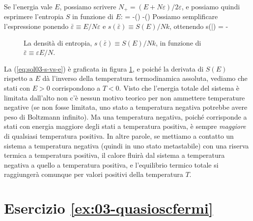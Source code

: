Se l'energia vale $E$, possiamo scrivere $N_{+} = (E+N\varepsilon)/2\varepsilon$, e possiamo quindi esprimere l'entropia $S$ in funzione di $E$:
\be
\label{eq:SE}
 = -\ln\left(\right)
-\ln\left(\right)
\ee
Possiamo semplificare l'espressione ponendo $\bar\varepsilon \equiv E/N\varepsilon$ e $s(\bar\varepsilon) \equiv S(E)/Nk$, ottenendo
\be
\label{eq:sol03-s-vs-e}
s(\bar\varepsilon) =  - 
\ee
\begin{figure}[h]
  \centering
  
  \caption{La densità di entropia, $s(\bar\varepsilon) \equiv S(E)/Nk$, in funzione di $\bar\varepsilon \equiv \varepsilon E/N$.} 
  \label{fig:03-sol-s-vs-e}
\end{figure}
\noindent
La (\ref{eq:sol03-s-vs-e}) è graficata in figura \ref{fig:03-sol-s-vs-e}, e poiché la derivata di $S(E)$ rispetto a $E$ dà l'inverso della temperatura termodinamica assoluta, vediamo che stati con $E > 0$ corrispondono a $T < 0$. Visto che l'energia totale del sistema è limitata dall'alto non c'è nessun motivo teorico per non ammettere temperature negative (se non fosse limitata, uno stato a temperatura negativa potrebbe avere peso di Boltzmann infinito). Ma una temperatura negativa, poiché corrisponde a stati con energia maggiore degli stati a temperatura positiva, è sempre {\em maggiore} di qualsiasi temperatura positiva. In altre parole, se mettiamo a contatto un sistema a temperatura negativa (quindi in uno stato metastabile) con una riserva termica a temperatura positiva, il calore fluirà dal sistema a temperatura negativa a quello a temperatura positiva, e l'equilibrio termico totale si raggiungerà comunque per valori positivi della temperatura $T$.

\section*{Esercizio \ref{ex:03-quasioscfermi}}

